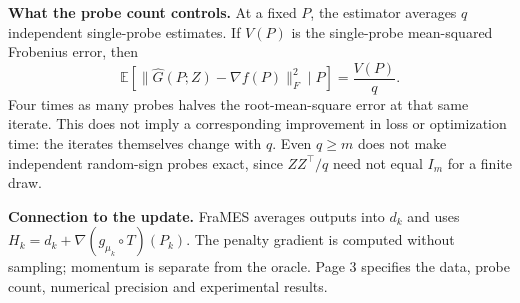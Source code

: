 \textbf{What the probe count controls.}
At a fixed $P$, the estimator averages $q$ independent single-probe estimates.
If $V(P)$ is the single-probe mean-squared Frobenius error, then
\[
 \mathbb E\!\left[\|\widehat G(P;Z)-\nabla f(P)\|_F^2\mid P\right]
 =\frac{V(P)}{q}.
\]
Four times as many probes halves the root-mean-square error at that same iterate.
This does not imply a corresponding improvement in loss or optimization time:
the iterates themselves change with $q$. Even $q\geq m$ does not make independent
random-sign probes exact, since $ZZ^\top/q$ need not equal $I_m$ for a finite draw.

\textbf{Connection to the update.}
FraMES averages outputs into $d_k$ and uses
\mbox{$H_k=d_k+\nabla(g_{\mu_k}\circ T)(P_k)$}. The penalty gradient is computed
without sampling; momentum is separate from the oracle.
\vfill
{\footnotesize\color{muted}Page 3 specifies the data, probe count, numerical precision and experimental results.}
